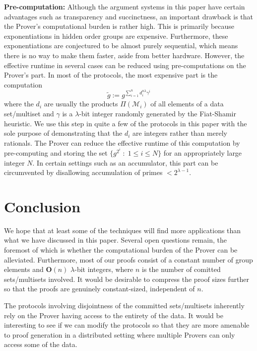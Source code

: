 \documentclass[11pt, lettersize, notitlepage, leqno, footskip=0.6cm]{article}
\newcommand{\slim}{\sum\limits}
\newcommand{\wti}{\widetilde}
\newcommand{\mc}{\mathcal}
\newcommand{\mbf}{\mathbf}
\newcommand{\lam}{\lambda}
\newcommand{\bO}{\mbf{O}}
\newcommand{\mcM}{\mc{M}}
\newcommand{\vs}{\vspace{-0.15cm}}
\newcommand{\noin}{\noindent}
\numberwithin{equation}{section}
\begin{document}

\bigskip

\noin \textbf{Pre-computation:} Although the argument systems in this paper have certain advantages such as transparency and succinctness, an important drawback is that the Prover's computational burden is rather high. This is primarily because exponentiations in hidden order groups are expensive. Furthermore, these exponentiations are conjectured to be almost purely sequential, which means there is no way to make them faster, aside from better hardware. However, the effective runtime in several cases can be reduced using pre-computations on the Prover's part. In most of the protocols, the most expensive part is the computation \vs $$\wti{g}:= g^{\slim_{i=1}^n d_i^{n\lam}\gamma^i}$$ where the $d_i$ are usually the products $\Pi(\mcM_i)$ of all elements of a data set/multiset and $\gamma$ is a $\lam$-bit integer randomly generated by the Fiat-Shamir heuristic. We use this step in quite a few of the protocols in this paper with the sole purpose of demonstrating that the $d_i$ are integers rather than merely rationals. The Prover can reduce the effective runtime of this computation by pre-computing and storing the set $\{g^{2^{i}}\;:\; 1\leq i\leq N \} $ for an appropriately large integer $N$. In certain settings such as an accumulator, this part can be circumvented by disallowing accumulation of primes $< 2^{\lam-1}$.



\section{\fontsize{12}{12}\selectfont Conclusion}

We hope that at least some of the techniques will find more applications than what we have discussed in this paper. Several open questions remain, the foremost of which is whether the computational burden of the Prover can be alleviated. Furthermore, most of our proofs consist of a constant number of group elements and $\bO(n)$ $\lam$-bit integers, where $n$ is the number of comitted sets/multisets involved. It would be desirable to compress the proof sizes further so that the proofs are genuinely constant-sized, independent of $n$. 

The protocols involving disjointness of the committed sets/multisets inherently rely on the Prover having access to the entirety of the data. It would be interesting to see if we can modify the protocols so that they are more amenable to proof generation in a distributed setting where multiple Provers can only access some of the data.
\end{document}
